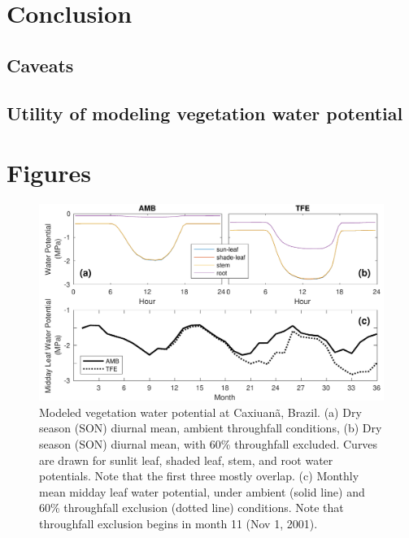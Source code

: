 \documentclass[draft,linenumbers]{agujournal}
\begin{document}
\section{Conclusion}

\subsection{Caveats}

\subsection{Utility of modeling vegetation water potential}

\clearpage    

\section{Figures}
  \begin{figure}[h]
     \centering
     \includegraphics[width=30pc]{../figs2/fig2.pdf}
     \caption{Modeled vegetation water potential at  Caxiuan\~a, Brazil.
     (a) Dry season (SON) diurnal mean, ambient throughfall conditions,
     (b) Dry season (SON) diurnal mean, with 60\% throughfall excluded.
     Curves are drawn for sunlit leaf, shaded leaf, stem, and root water potentials. Note that the first three mostly overlap.
     (c) Monthly mean midday leaf water potential, under ambient (solid line) and 60\% throughfall exclusion (dotted line) conditions.
     Note that throughfall exclusion begins in month 11 (Nov 1, 2001).
     }
     \label{fig:vwp}
  \end{figure}
  
\end{document}

